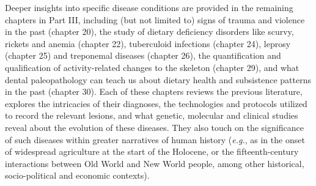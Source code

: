 \documentclass{ijsra}
\begin{document}
Deeper insights into specific disease conditions are provided in the remaining chapters in Part III, including (but not limited to) signs of trauma and violence in the past (chapter 20), the study of dietary deficiency disorders like scurvy, rickets and anemia (chapter 22), tuberculoid infections (chapter 24), leprosy (chapter 25) and treponemal diseases (chapter 26), the quantification and qualification of activity-related changes to the skeleton (chapter 29), and what dental paleopathology can teach us about dietary health and subsistence patterns in the past (chapter 30).
Each of these chapters reviews the previous literature, explores the intricacies of their diagnoses, the technologies and protocols utilized to record the relevant lesions, and what genetic, molecular and clinical studies reveal about the evolution of these diseases.
They also touch on the significance of such diseases within greater narratives of human history (\textit{e.g.}, as in the onset of widespread agriculture at the start of the Holocene, or the fifteenth-century interactions between Old World and New World people, among other historical, socio-political and economic contexts).
\end{document}

